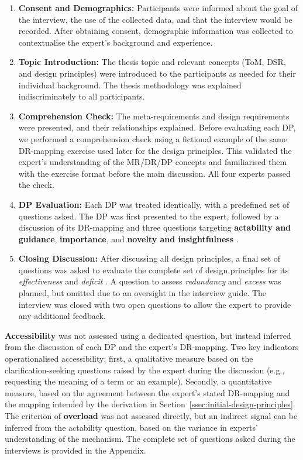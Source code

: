 \begin{enumerate}
    \item \textbf{Consent and Demographics:} Participants were informed about the goal of the interview, the use of the collected data, and that the interview would be recorded. After obtaining consent, demographic information was collected to contextualise the expert's background and experience.
    \item \textbf{Topic Introduction:} The thesis topic and relevant concepts (\ac{ToM}, \ac{DSR}, and design principles) were introduced to the participants as needed for their individual background. The thesis methodology was explained indiscriminately to all participants.
    \item \textbf{Comprehension Check:} The meta-requirements and design requirements were presented, and their relationships explained. Before evaluating each \ac{DP}, we performed a comprehension check using a fictional example of the same \ac{DR}-mapping exercise used later for the design principles. This validated the expert's understanding of the \ac{MR}/\ac{DR}/\ac{DP} concepts and familiarised them with the exercise format before the main discussion. All four experts passed the check.
    \item \textbf{\ac{DP} Evaluation:} Each \ac{DP} was treated identically, with a predefined set of questions asked. The \ac{DP} was first presented to the expert, followed by a discussion of its \ac{DR}-mapping and three questions targeting \textbf{actability and guidance}, \textbf{importance}, and \textbf{novelty and insightfulness} \parencite{Iivari2021}.
    \item \textbf{Closing Discussion:} After discussing all design principles, a final set of questions was asked to evaluate the complete set of design principles for its \textit{effectiveness} \parencite{Iivari2021} and \textit{deficit} \parencite{Janiesch2020}. A question to assess \textit{redundancy} and \textit{excess} was planned, but omitted due to an oversight in the interview guide. The interview was closed with two open questions to allow the expert to provide any additional feedback.
\end{enumerate}

\textbf{Accessibility} \parencite[cf.][]{Iivari2021} was not assessed using a dedicated question, but instead inferred from the discussion of each \ac{DP} and the expert's \ac{DR}-mapping. Two key indicators operationalised accessibility: first, a qualitative measure based on the clarification-seeking questions raised by the expert during the discussion (e.g., requesting the meaning of a term or an example). Secondly, a quantitative measure, based on the agreement between the expert's stated \ac{DR}-mapping and the mapping intended by the derivation in Section~\ref{ssec:initial-design-principles}. The criterion of \textbf{overload} \parencite[cf.][]{Janiesch2020} was not assessed directly, but an indirect signal can be inferred from the actability question, based on the variance in experts' understanding of the mechanism. The complete set of questions asked during the interviews is provided in the Appendix.

